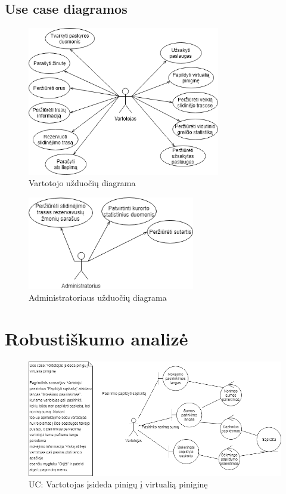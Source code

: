 \documentclass[oneside]{VUMIFPSkursinis}
\begin{document}
\subsection{Use case diagramos}
\begin{figure}[h]
    \centering
    \includegraphics[width=0.75\textwidth]{useCaseVartotojas.png}
    \caption{Vartotojo užduočių diagrama}
    \label{fig:VartotojoUseCasel}
\end{figure}
\vskip 1cm
\begin{figure}[h]
    \centering
    \includegraphics[width=0.65\textwidth]{useCaseAdministratorius.png}
    \caption{Administratoriaus užduočių diagrama}
    \label{fig:AdministratoriausUseCase}
\end{figure}

\break

\section{Robustiškumo analizė}
\begin{figure}[h]
    \centering
    \includegraphics[width=1.0\textwidth]{Rob1.png}
    \caption{UC: Vartotojas įsideda pinigų į virtualią piniginę}
    \label{fig:rob1}
\end{figure}
\vskip 1cm
\end{document}
